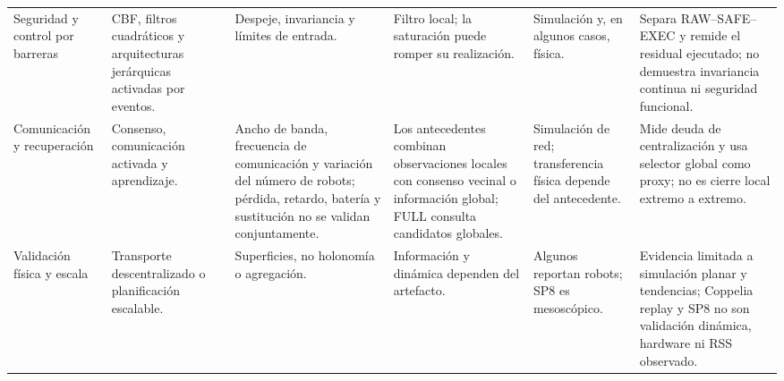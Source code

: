 \begin{landscape}
\begin{longtable}{@{}p{3.2cm}p{3.4cm}p{3.5cm}p{3.2cm}p{2.5cm}p{5.2cm}@{}}
Seguridad y control por barreras \citep{ames2017cbf,zhuang2026safe} & CBF, filtros cuadráticos y arquitecturas jerárquicas activadas por eventos. & Despeje, invariancia y límites de entrada. & Filtro local; la saturación puede romper su realización. & Simulación y, en algunos casos, física. & Separa RAW--SAFE--EXEC y remide el residual ejecutado; no demuestra invariancia continua ni seguridad funcional. \\
Comunicación y recuperación \citep{shibata2022learning,shibata2023event,naito2024tihdp} & Consenso, comunicación activada y aprendizaje. & Ancho de banda, frecuencia de comunicación y variación del número de robots; pérdida, retardo, batería y sustitución no se validan conjuntamente. & Los antecedentes combinan observaciones locales con consenso vecinal o información global; FULL consulta candidatos globales. & Simulación de red; transferencia física depende del antecedente. & Mide deuda de centralización y usa selector global como proxy; no es cierre local extremo a extremo. \\
Validación física y escala \citep{bhatt2026box,guan2025low} & Transporte descentralizado o planificación escalable. & Superficies, no holonomía o agregación. & Información y dinámica dependen del artefacto. & Algunos reportan robots; SP8 es mesoscópico. & Evidencia limitada a simulación planar y tendencias; Coppelia replay y SP8 no son validación dinámica, hardware ni RSS observado. \\
\end{longtable}
\endgroup
\end{landscape}

